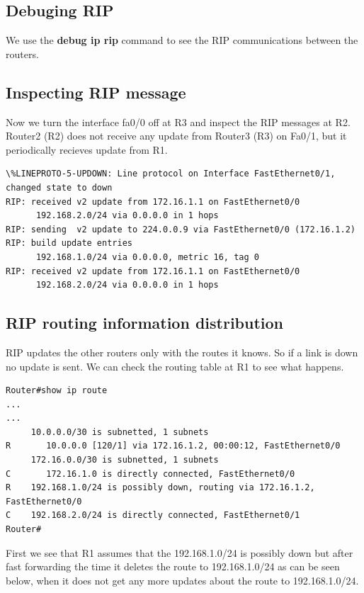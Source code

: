 \documentclass{article}
\begin{document}
\subsection{Debuging RIP}

We use the \textbf{debug ip rip} command to see the RIP communications between the routers. 

\subsection{Inspecting RIP message}

Now we turn the interface fa0/0 off at R3 and inspect the RIP messages at R2. Router2 (R2) does not receive any update from Router3 (R3) on  Fa0/1, but it periodically recieves update from R1. 

\begin{verbatim}
\%LINEPROTO-5-UPDOWN: Line protocol on Interface FastEthernet0/1, changed state to down
RIP: received v2 update from 172.16.1.1 on FastEthernet0/0
      192.168.2.0/24 via 0.0.0.0 in 1 hops
RIP: sending  v2 update to 224.0.0.9 via FastEthernet0/0 (172.16.1.2)
RIP: build update entries
      192.168.1.0/24 via 0.0.0.0, metric 16, tag 0
RIP: received v2 update from 172.16.1.1 on FastEthernet0/0
      192.168.2.0/24 via 0.0.0.0 in 1 hops
\end{verbatim}

\subsection{RIP routing information distribution}

RIP updates the other routers only with the routes it knows. So if a link is down no update is sent.
We can check the routing table at R1 to see what happens. 
\begin{verbatim}
Router#show ip route
...
...
     10.0.0.0/30 is subnetted, 1 subnets
R       10.0.0.0 [120/1] via 172.16.1.2, 00:00:12, FastEthernet0/0
     172.16.0.0/30 is subnetted, 1 subnets
C       172.16.1.0 is directly connected, FastEthernet0/0
R    192.168.1.0/24 is possibly down, routing via 172.16.1.2, FastEthernet0/0
C    192.168.2.0/24 is directly connected, FastEthernet0/1
Router#

\end{verbatim}

First we see that R1 assumes that the 192.168.1.0/24 is possibly down but after fast forwarding the time it deletes the route to 192.168.1.0/24 as can be seen below,  when it does not get any more updates about the route to 192.168.1.0/24.
\end{document}
